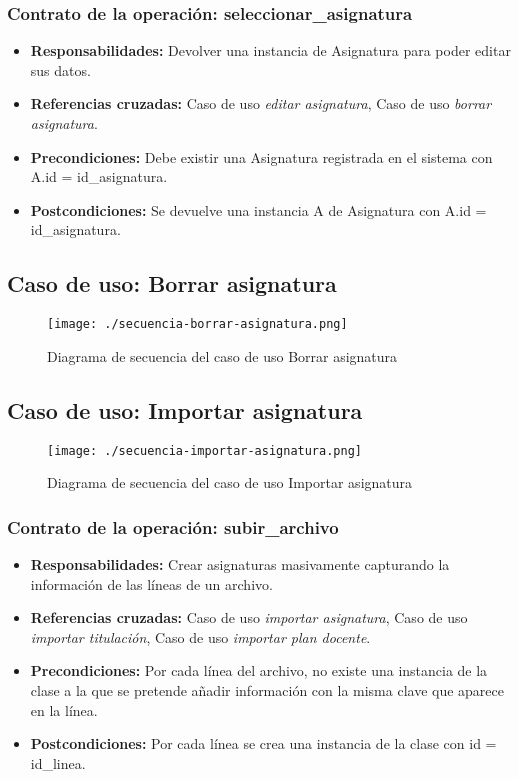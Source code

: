 \subsubsection{Contrato de la operación: seleccionar\_asignatura}
\begin{itemize}
\item {\bf Responsabilidades:} Devolver una instancia de Asignatura para poder editar sus datos.
\item {\bf Referencias cruzadas:} Caso de uso {\em editar asignatura}, Caso de uso {\em borrar asignatura}.
\item {\bf Precondiciones:} Debe existir una Asignatura registrada en el sistema con A.id = id\_asignatura.
\item {\bf Postcondiciones:} Se devuelve una instancia A de Asignatura con A.id = id\_asignatura.
\end{itemize}

\subsection{Caso de uso: Borrar asignatura}
\begin{figure}[H] 
  \label{comportamiento-borrar-asignatura} 
	\begin{center}
    \texttt{[image: ./secuencia-borrar-asignatura.png]}
  \end{center}
\caption{Diagrama de secuencia del caso de uso Borrar asignatura}
\end{figure}

\subsection{Caso de uso: Importar asignatura}
\begin{figure}[H] 
  \label{comportamiento-importar-asignatura} 
	\begin{center}
    \texttt{[image: ./secuencia-importar-asignatura.png]}
  \end{center}
\caption{Diagrama de secuencia del caso de uso Importar asignatura}
\end{figure}

\subsubsection{Contrato de la operación: subir\_archivo}
\begin{itemize}
\item {\bf Responsabilidades:} Crear asignaturas masivamente capturando la información de las líneas de un archivo.
\item {\bf Referencias cruzadas:} Caso de uso {\em importar asignatura}, Caso de uso {\em importar titulación}, Caso de uso {\em importar plan docente}.
\item {\bf Precondiciones:} Por cada línea del archivo, no existe una instancia de la clase a la que se pretende añadir información con la misma clave que aparece en la línea.
\item {\bf Postcondiciones:} Por cada línea se crea una instancia de la clase con id = id\_linea.
\end{itemize}

